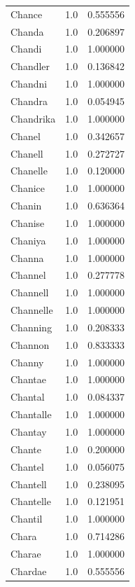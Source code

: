 \documentclass[
  letterpaper,
  DIV=11,
  numbers=noendperiod]{scrreprt}
\begin{document}
\begin{tabular}{lrr}
Chance          &   1.0 &   0.555556 \\
Chanda          &   1.0 &   0.206897 \\
Chandi          &   1.0 &   1.000000 \\
Chandler        &   1.0 &   0.136842 \\
Chandni         &   1.0 &   1.000000 \\
Chandra         &   1.0 &   0.054945 \\
Chandrika       &   1.0 &   1.000000 \\
Chanel          &   1.0 &   0.342657 \\
Chanell         &   1.0 &   0.272727 \\
Chanelle        &   1.0 &   0.120000 \\
Chanice         &   1.0 &   1.000000 \\
Chanin          &   1.0 &   0.636364 \\
Chanise         &   1.0 &   1.000000 \\
Chaniya         &   1.0 &   1.000000 \\
Channa          &   1.0 &   1.000000 \\
Channel         &   1.0 &   0.277778 \\
Channell        &   1.0 &   1.000000 \\
Channelle       &   1.0 &   1.000000 \\
Channing        &   1.0 &   0.208333 \\
Channon         &   1.0 &   0.833333 \\
Channy          &   1.0 &   1.000000 \\
Chantae         &   1.0 &   1.000000 \\
Chantal         &   1.0 &   0.084337 \\
Chantalle       &   1.0 &   1.000000 \\
Chantay         &   1.0 &   1.000000 \\
Chante          &   1.0 &   0.200000 \\
Chantel         &   1.0 &   0.056075 \\
Chantell        &   1.0 &   0.238095 \\
Chantelle       &   1.0 &   0.121951 \\
Chantil         &   1.0 &   1.000000 \\
Chara           &   1.0 &   0.714286 \\
Charae          &   1.0 &   1.000000 \\
Chardae         &   1.0 &   0.555556 \\

\end{tabular}
\end{document}
